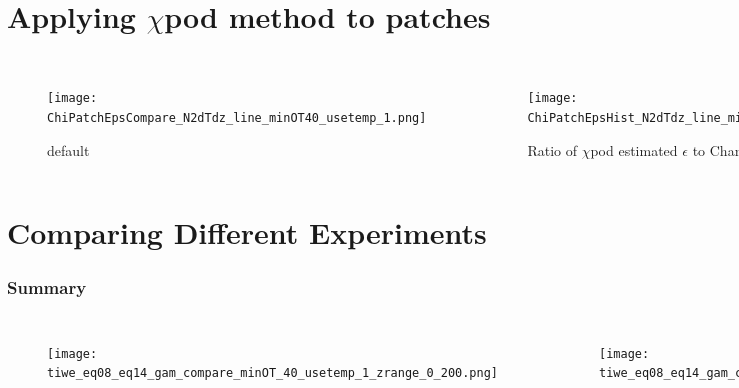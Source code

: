 \documentclass{beamer}
\begin{document}
\section{Applying $\chi$pod method to patches}

\begin{frame}
 \frametitle{ }
 
 
\begin{columns}


 \begin{figure}[htbp]
\begin{center}
\texttt{[image: ChiPatchEpsCompare\_N2dTdz\_line\_minOT40\_usetemp\_1.png]}
\caption{default}
\label{default}
\end{center}
\end{figure}


 \begin{figure}[htbp]
\begin{center}
\texttt{[image: ChiPatchEpsHist\_N2dTdz\_line\_minOT40\_usetemp\_1.png]}
\caption{Ratio of $\chi$pod estimated $\epsilon$ to Chameleon $\epsilon$ for patches.}
\label{default}
\end{center}
\end{figure}

\end{columns}

\end{frame}




\section{Comparing Different Experiments}

\begin{frame}
 \frametitle{ Summary}


\begin{columns}



 \begin{figure}[htbp]
\begin{center}
\texttt{[image: tiwe\_eq08\_eq14\_gam\_compare\_minOT\_40\_usetemp\_1\_zrange\_0\_200.png]}
\caption{}
\label{default}
\end{center}
\end{figure}



 \begin{figure}[htbp]
\begin{center}
\texttt{[image: tiwe\_eq08\_eq14\_gam\_compare\_minOT\_40\_usetemp\_1\_zrange\_80\_200.png]}
\caption{}
\label{default}
\end{center}
\end{figure}

\end{columns}

\end{frame}
\end{document}
